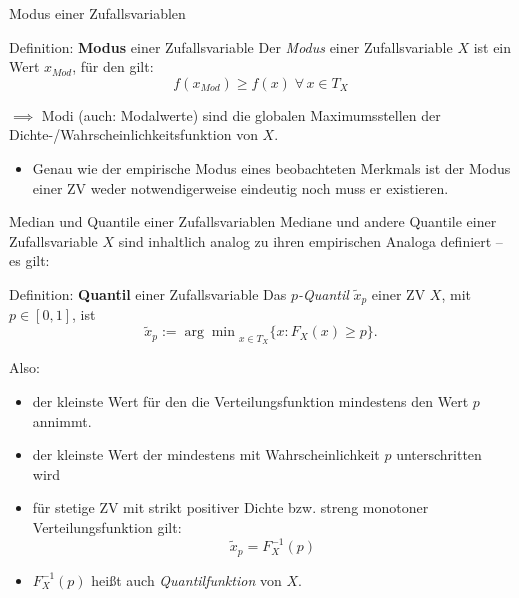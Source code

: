 \documentclass[
  10pt,
  ignorenonframetext,
]{beamer}
\providecommand{\tightlist}{%
  \setlength{\itemsep}{0pt}\setlength{\parskip}{0pt}}
\begin{document}
\begin{frame}{Modus einer Zufallsvariablen}
\label{modus-einer-zufallsvariablen}
\begin{block}{Definition: \textbf{Modus} einer Zufallsvariable}
\label{definition-modus-einer-zufallsvariable}
Der \emph{Modus} einer Zufallsvariable \(X\) ist ein Wert \(x_{Mod}\),
für den gilt: \[
f(x_{Mod}) \geq f(x)\;\forall\, x \in T_X 
\]
\end{block}

\(\implies\) Modi (auch: Modalwerte) sind die globalen Maximumsstellen
der Dichte-/Wahrscheinlichkeitsfunktion von \(X\).

\begin{itemize}
\tightlist
\item
  Genau wie der empirische Modus eines beobachteten Merkmals ist der
  Modus einer ZV weder notwendigerweise eindeutig noch muss er
  existieren.
\end{itemize}
\end{frame}

\begin{frame}{Median und Quantile einer Zufallsvariablen}
\label{median-und-quantile-einer-zufallsvariablen}
Mediane und andere Quantile einer Zufallsvariable \(X\) sind inhaltlich
analog zu ihren empirischen Analoga definiert -- es gilt:

\begin{block}{Definition: \textbf{Quantil} einer Zufallsvariable}
\label{definition-quantil-einer-zufallsvariable}
Das \emph{\(p\)-Quantil} \(\tilde x_p\) einer ZV \(X\), mit
\(p \in [0, 1]\), ist
\[\tilde x_p := {\arg\min}_{x \in T_X}\{x: F_X(x) \geq p\}.\]
\end{block}

Also:

\begin{itemize}
\tightlist
\item
  der kleinste Wert für den die Verteilungsfunktion mindestens den Wert
  \(p\) annimmt.
\item
  der kleinste Wert der mindestens mit Wahrscheinlichkeit \(p\)
  unterschritten wird
\item
  für stetige ZV mit strikt positiver Dichte bzw. streng monotoner
  Verteilungsfunktion gilt: \[\tilde x_p = F_X^{-1}(p)\]
\item
  \(F_X^{-1}(p)\) heißt auch \emph{Quantilfunktion} von \(X\).
\end{itemize}
\end{frame}
\end{document}
